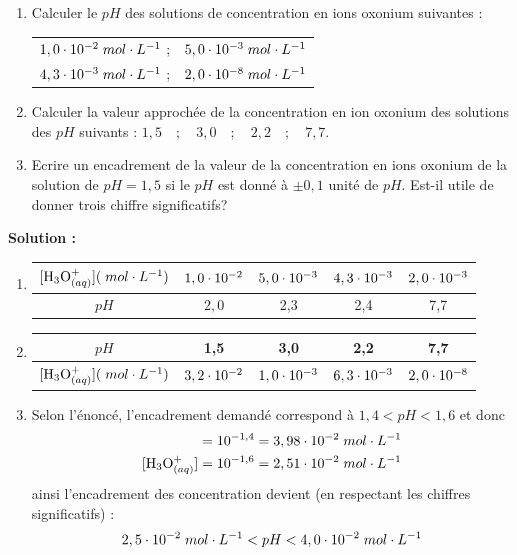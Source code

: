 \documentclass[11pt,a4paper]{article}
\begin{document}
\begin{exo}
\begin{enumerate}
    \item Calculer le $pH$ des solutions de concentration en ions oxonium suivantes : 
    \begin{center}
      \begin{tabular}{c c}
        $1,0\cdot10^{-2} \; mol\cdot L^{-1}$ \quad ;  & $5,0\cdot10^{-3} \; mol\cdot L^{-1}$ \\
        $4,3\cdot10^{-3} \; mol\cdot L^{-1}$ \quad ; & $2,0\cdot10^{-8} \; mol\cdot L^{-1}$ \\
    \end{tabular}  
    \end{center}
    \item Calculer la valeur approchée de la concentration en ion oxonium des solutions des $pH$ suivants : $1,5 \quad ; \quad 3,0 \quad ; \quad 2,2 \quad ; \quad 7,7$.
    \item Ecrire un encadrement de la valeur de la concentration en ions oxonium de la solution de $pH = 1,5$ si le $pH$ est donné à $\pm 0,1$ unité de $pH$. Est-il utile de donner trois chiffre significatifs? 
\end{enumerate}    

\textbf{Solution : }
\begin{enumerate}
    \item 
    
    \begin{tabular}{c||c|c|c|c}
         $[\oxo](\mpl)$ & $1,0\cdot10^{-2}$  & $5,0\cdot10^{-3} $ & $4,3\cdot10^{-3}$ & $2,0\cdot10^{-3} $ \\ \hline
         $pH$ &  $2,0$ & 2,3 & 2,4 & 7,7 
    \end{tabular}    
    \vspace{0.5cm}
    \item     
    
    \begin{tabular}{c||c|c|c|c}
         $pH$ &  1,5 & 3,0 & 2,2 & 7,7  \\ \hline
         $[\oxo](\mpl)$ & $3,2\cdot10^{-2}$  & $1,0\cdot10^{-3} $ & $6,3\cdot10^{-3}$ & $2,0\cdot10^{-8} $         
    \end{tabular}    
    \vspace{0.5cm}
    \item Selon l'énoncé, l'encadrement demandé correspond à $1,4 < pH < 1,6$ et donc 
       \begin{align*}
        [\oxo] &= 10^{-1,4} = 3,98\es{-2}\mpl \\
        [\oxo] &= 10^{-1,6} = 2,51\es{-2}\mpl
    \end{align*}    
    ainsi l'encadrement des concentration devient (en respectant les chiffres significatifs) : 
    $$ 2,5\cdot10^{-2}\; mol\cdot L^{-1} < pH < 4,0 \cdot10^{-2}\; mol\cdot L^{-1}$$
\end{enumerate}
\end{exo}	
\end{document}
